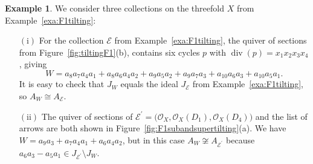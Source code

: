 \documentclass[11pt,a4paper]{amsart}
\numberwithin{equation}{section}
\theoremstyle{definition}
\newtheorem{example}[theorem]{Example}
\theoremstyle{remark}
\newcommand{\one}{\ensuremath{(\mathrm{i})}}
\newcommand{\two}{\ensuremath{(\mathrm{ii})}}
\renewcommand{\div}{\operatorname{div}}
\begin{document}
\begin{example}
\label{exa:superpotentialF1tilting}
We consider three collections on the threefold $X$ from Example~\ref{exa:F1tilting}:
\begin{enumerate}
\item[\one] For the collection $\mathscr{E}$ from Example~\ref{exa:F1tilting}, the quiver of sections from Figure~\ref{fig:tiltingF1}(b), contains six cycles $p$ with $\div(p)=x_1x_2x_3x_4$, giving 
\[
W= a_8a_7a_4a_1 + a_8a_6a_4a_2 +  a_9a_5a_2 + a_9a_7a_3 +a_{10}a_6a_3 + a_{10}a_5a_1.
\]
It is easy to check that $J_W$ equals the ideal $J_\mathscr{E}$ from Example~\ref{exa:F1tilting}, so $A_W\cong A_\mathscr{E}$.
 \item[\two] The quiver of sections of $\mathscr{E}^\prime = \big(\mathcal{O}_X, \mathcal{O}_X(D_1),\mathcal{O}_X(D_4)\big)$ and the list of arrows are both shown in Figure~\ref{fig:F1subandsupertilting}(a). We have $W= a_9a_3 + a_7a_4a_1 + a_6a_4a_2$, but in this case $A_W\not\cong A_{\mathscr{E}^\prime}$ because $a_6a_3 - a_5a_1 \in J_{\mathscr{E}^\prime}\setminus J_W$. 
    \begin{figure}[!ht]
    \centering
\end{figure}
\end{enumerate}
\end{example}
\end{document}
